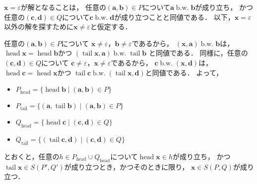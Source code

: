 \documentclass{ltjsarticle}
\newcommand\bw{\mathrel{\text{b.w.}}}
\DeclareMathOperator\head{head}
\DeclareMathOperator\tail{tail}
\begin{document}
$\boldsymbol{x} = \varepsilon$が解となることは，
任意の$(\boldsymbol{a}, \boldsymbol{b}) \in P$について$\boldsymbol{a} \bw \boldsymbol{b}$が成り立ち，
かつ任意の$(\boldsymbol{c}, \boldsymbol{d}) \in Q$について$\boldsymbol{c} \bw \boldsymbol{d}$が成り立つことと同値である．
以下，$\boldsymbol{x} = \varepsilon$以外の解を探すために$\boldsymbol{x} \ne \varepsilon$と仮定する．

任意の$(\boldsymbol{a}, \boldsymbol{b}) \in P$について
$\boldsymbol{x} \ne \varepsilon$，$\boldsymbol{b} \ne \varepsilon$であるから，
$(\boldsymbol{x}, \boldsymbol{a}) \bw \boldsymbol{b}$は，
$\head \boldsymbol{x} = \head \boldsymbol{b}$かつ
$(\tail \boldsymbol{x}, \boldsymbol{a}) \bw \tail \boldsymbol{b}$
と同値である．
同様に，任意の$(\boldsymbol{c}, \boldsymbol{d}) \in Q$について
$\boldsymbol{c} \ne \varepsilon$，$\boldsymbol{x} \ne \varepsilon$であるから，
$\boldsymbol{c} \bw (\boldsymbol{x}, \boldsymbol{d})$は，
$\head \boldsymbol{c} = \head \boldsymbol{x}$かつ
$\tail\boldsymbol{c} \bw (\tail\boldsymbol{x}, \boldsymbol{d})$と同値である．
よって，
\begin{itemize}
  \item $P_\text{head} = \{\head \boldsymbol{b} \mid (\boldsymbol{a}, \boldsymbol{b}) \in P\}$
  \item $P_\text{tail} = \{(\boldsymbol{a}, \tail \boldsymbol{b}) \mid (\boldsymbol{a}, \boldsymbol{b}) \in P\}$
  \item $Q_\text{head} = \{\head \boldsymbol{c} \mid (\boldsymbol{c}, \boldsymbol{d}) \in Q\}$
  \item $Q_\text{tail} = \{(\tail \boldsymbol{c}, \boldsymbol{d}) \mid (\boldsymbol{c}, \boldsymbol{d}) \in Q\}$
\end{itemize}
とおくと，任意の$h \in P_\text{head} \cup Q_\text{head}$について$\head \boldsymbol{x} \in h$が成り立ち，
かつ$\tail \boldsymbol{x} \in S(P', Q')$が成り立つとき，かつそのときに限り，
$\boldsymbol{x} \in S(P, Q)$が成り立つ．
\end{document}
